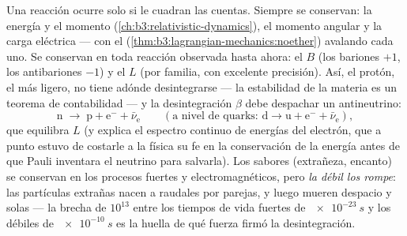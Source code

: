\begin{proposition}\label{prop:b3:particle-physics:conservation}
Una reacción ocurre solo si le cuadran las cuentas. Siempre se
conservan: la energía y el momento
(\cref{ch:b3:relativistic-dynamics}), el momento angular y la
carga eléctrica --- con el 
(\cref{thm:b3:lagrangian-mechanics:noether}) avalando cada uno.
Se conservan en toda reacción observada hasta ahora: el \emph{}
$B$ (los bariones $+1$, los antibariones $-1$) y el \emph{}
$L$ (por familia, con excelente precisión). Así, el protón, el
 más ligero, no tiene adónde desintegrarse --- la estabilidad de la materia es
un teorema de contabilidad --- y la desintegración $\beta$ debe despachar un
antineutrino:
\[
\text{n} \;\to\; \text{p} + \text{e}^- + \bar\nu_{\text{e}}
\qquad (\text{a nivel de quarks: } \text{d} \to \text{u} +
\text{e}^- + \bar\nu_{\text{e}}) ,
\]
que equilibra $L$ (y explica el espectro continuo de energías del electrón,
que a punto estuvo de costarle a la física su fe en la conservación
de la energía antes de que Pauli inventara el neutrino para salvarla).
Los sabores (extrañeza, encanto) se conservan en los procesos fuertes y
electromagnéticos, pero \emph{la débil los rompe}: las partículas
extrañas nacen a raudales por parejas, y luego mueren despacio y solas
--- la brecha de $10^{13}$ entre los tiempos de vida fuertes de $\qty{e-23}{s}$
y los débiles de $\qty{e-10}{s}$ es la huella de qué fuerza
firmó la desintegración.
\end{proposition}
\admitted

